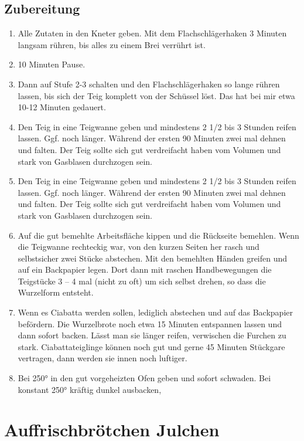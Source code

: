 \documentclass[10pt,a4paper,ngerman, DIV=16]{scrartcl}
\begin{document}
\subsection*{Zubereitung}
\begin{enumerate}
    \item Alle Zutaten in den Kneter geben. Mit dem Flachschlägerhaken  3 Minuten langsam rühren, bis alles zu einem Brei verrührt ist.
    \item 10 Minuten Pause.
    \item Dann auf Stufe 2-3 schalten und den Flachschlägerhaken so lange rühren lassen, bis sich der Teig komplett von der Schüssel löst. Das hat bei mir etwa 10-12 Minuten gedauert.
    \item Den Teig in eine Teigwanne geben und mindestens 2 1/2 bis 3 Stunden reifen lassen. Ggf. noch länger. Während der ersten 90 Minuten zwei mal dehnen und falten. Der Teig sollte sich gut verdreifacht haben vom Volumen und stark von Gasblasen durchzogen sein.
    \item Den Teig in eine Teigwanne geben und mindestens 2 1/2 bis 3 Stunden reifen lassen. Ggf. noch länger. Während der ersten 90 Minuten zwei mal dehnen und falten. Der Teig sollte sich gut verdreifacht haben vom Volumen und stark von Gasblasen durchzogen sein.
    \item Auf die gut bemehlte Arbeitsfläche kippen und die Rückseite bemehlen. Wenn die Teigwanne rechteckig war, von den kurzen Seiten her rasch und selbstsicher zwei Stücke abstechen. Mit den bemehlten Händen greifen und auf ein Backpapier legen. Dort dann mit raschen Handbewegungen die Teigstücke 3 – 4 mal (nicht zu oft) um sich selbst drehen, so dass die Wurzelform entsteht.
    \item Wenn es Ciabatta werden sollen, lediglich abstechen und auf das Backpapier befördern. Die Wurzelbrote noch etwa 15 Minuten entspannen lassen und dann sofort backen. Lässt man sie länger reifen, verwischen die Furchen zu stark. Ciabattateiglinge können noch gut und gerne 45 Minuten Stückgare vertragen, dann werden sie innen noch luftiger.
    \item Bei 250° in den gut vorgeheizten Ofen geben und sofort schwaden. Bei konstant 250° kräftig dunkel ausbacken,
\end{enumerate}




\section{Auffrischbrötchen Julchen}  
\cite{sonjajulchen2022}
\end{document}
